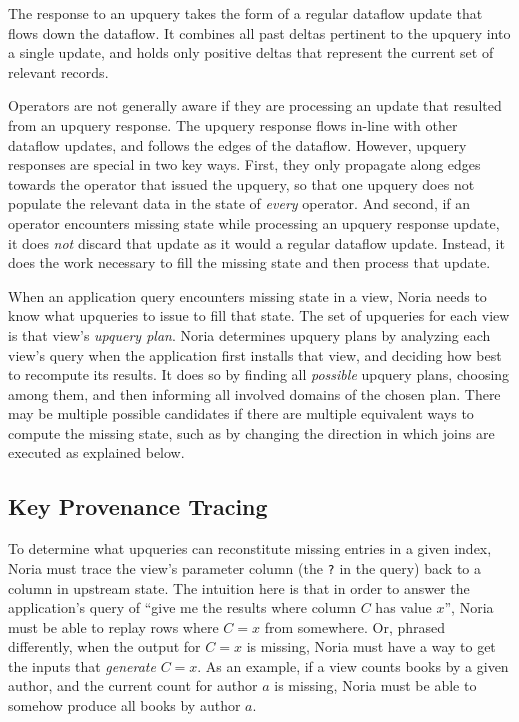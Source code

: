 The response to an upquery takes the form of a regular dataflow update that
flows down the dataflow. It combines all past deltas pertinent to the upquery
into a single update, and holds only positive deltas that represent the current
set of relevant records.

Operators are not generally aware if they are processing an update that resulted
from an upquery response. The upquery response flows in-line with other dataflow
updates, and follows the edges of the dataflow. However, upquery responses are
special in two key ways. First, they only propagate along edges towards the
operator that issued the upquery, so that one upquery does not populate the
relevant data in the state of \emph{every} operator. And second, if an operator
encounters missing state while processing an upquery response update, it does
\emph{not} discard that update as it would a regular dataflow update. Instead,
it does the work necessary to fill the missing state and then process that
update.

When an application query encounters missing state in a view, Noria needs to
know what upqueries to issue to fill that state. The set of upqueries for each
view is that view's \textit{upquery plan}. Noria determines upquery plans by
analyzing each view's query when the application first installs that view, and
deciding how best to recompute its results. It does so by finding all
\emph{possible} upquery plans, choosing among them, and then informing all
involved domains of the chosen plan. There may be multiple possible candidates
if there are multiple equivalent ways to compute the missing state, such as by
changing the direction in which joins are executed as explained below.

\subsection{Key Provenance Tracing}

To determine what upqueries can reconstitute missing entries in a given index,
Noria must trace the view's parameter column (the \texttt{?} in the query) back
to a column in upstream state. The intuition here is that in order to answer the
application's query of ``give me the results where column $C$ has value $x$'',
Noria must be able to replay rows where $C = x$ from somewhere. Or, phrased
differently, when the output for $C = x$ is missing, Noria must have a way to
get the inputs that \emph{generate} $C = x$. As an example, if a view counts
books by a given author, and the current count for author $a$ is missing, Noria
must be able to somehow produce all books by author $a$.

